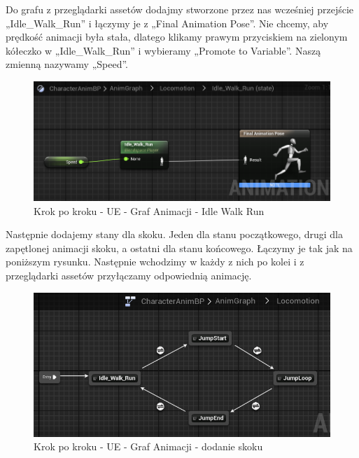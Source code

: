 \documentclass[openright]{xmgr}
\begin{document}
Do grafu z przeglądarki assetów dodajmy stworzone przez nas wcześniej przejście „Idle\_Walk\_Run” i łączymy je z „Final Animation Pose”.  Nie chcemy, aby prędkość animacji była stała, dlatego klikamy prawym przyciskiem na zielonym kółeczko w „Idle\_Walk\_Run” i wybieramy „Promote to Variable”. Naszą zmienną nazywamy „Speed”.

\begin{figure}[!htb]
    \begin{center}
    \includegraphics[scale=0.6]{Screeny/UeKrokPoKroku/UE-AnimGraph-IdleWalkRun.png}
    \end{center}
    \caption{Krok po kroku - UE - Graf Animacji - Idle Walk Run}
\end{figure}

\newpage
Następnie dodajemy stany dla skoku. Jeden dla stanu początkowego, drugi dla zapętlonej animacji skoku, a ostatni dla stanu końcowego. Łączymy je tak jak na poniższym rysunku. Następnie wchodzimy w każdy z nich po kolei i z przeglądarki assetów przyłączamy odpowiednią animację.

\begin{figure}[!htb]
    \begin{center}
    \includegraphics[scale=0.6]{Screeny/UeKrokPoKroku/UE-AnimGraph-Anim.png}
    \end{center}
    \caption{Krok po kroku - UE -  Graf Animacji - dodanie skoku}
\end{figure}
\end{document}
